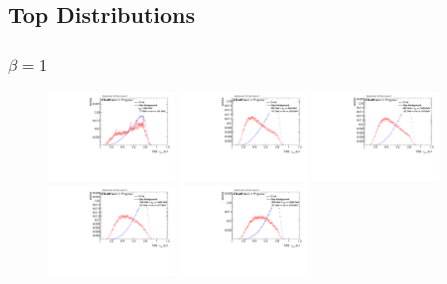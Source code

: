 \subsection{Top Distributions}
\subsubsection*{$\beta=1$}
\vspace{-0.5cm}
\begin{figure}[H]
\includegraphics[width=0.3\textwidth]{sascha_input/Appendix/Distributions/top/distributions/beta1/h_assisted_tj_nSub32_bin1.pdf} \hspace{1mm}
\includegraphics[width=0.3\textwidth]{sascha_input/Appendix/Distributions/top/distributions/beta1/h_assisted_tj_nSub32_bin2.pdf} \hspace{1mm}
\includegraphics[width=0.3\textwidth]{sascha_input/Appendix/Distributions/top/distributions/beta1/h_assisted_tj_nSub32_bin3.pdf} 
\bigskip
\includegraphics[width=0.3\textwidth]{sascha_input/Appendix/Distributions/top/distributions/beta1/h_assisted_tj_nSub32_bin4.pdf} \hspace{1mm}
\includegraphics[width=0.3\textwidth]{sascha_input/Appendix/Distributions/top/distributions/beta1/h_assisted_tj_nSub32_bin5.pdf} \hspace{1mm}

\end{figure}
